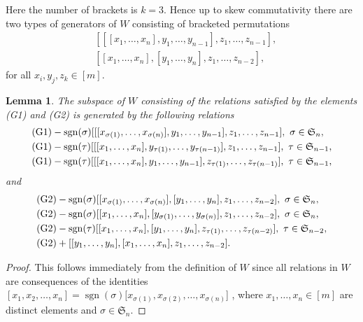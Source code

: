 \documentclass[11pt]{amsart}
\newtheorem{lem}[thm]{Lemma}
\theoremstyle{definition}
\numberwithin{equation}{section}
\DeclareMathOperator{\sign}{sgn}
\begin{document}
Here the number of brackets is $k=3$. Hence up to skew commutativity there are two types of generators of $W$ consisting of bracketed permutations
\begin{align}\tag{G1} &[[[{x_1},\dots ,{x_n} ],{y_{1}},\dots, y_{n-1}], z_{1},\dots ,z_{n-1}  ], \\&\tag{G2}[[{x_1},\dots ,{x_n} ],[{y_{1}},\dots, y_{n}], z_{1},\dots ,z_{n-2}  ],
\end{align}
for all $x_i, y_j, z_k \in [m]$.
\begin{lem}\label{Wgen} The subspace of $W$ consisting of the relations satisfied by the elements \textup{(G1)} and \textup{(G2)} is generated by the following relations
	\begin{align}
		\label{51}\textup{(G1)}&- \sign(\sigma)[[[{x_{\sigma(1)}},\dots ,{x_{\sigma(n)}} ],{y_{1}},\dots, y_{n-1}], z_{1},\dots ,z_{n-1}], \ \sigma \in \mathfrak{S}_n, \\\label{52}\textup{(G1)}&-\sign(\tau)[[[{x_{1}},\dots ,{x_{n}} ],{y_{\tau(1)}},\dots, y_{\tau(n-1)}], z_{1},\dots ,z_{n-1}], \ \tau \in \mathfrak{S}_{n-1},\\\label{53}\textup{(G1)}&-\sign(\tau)[[[{x_{1}},\dots ,{x_{n}} ],{y_{1}},\dots, y_{n-1}], z_{\tau(1)},\dots ,z_{\tau(n-1)}], \ \tau \in \mathfrak{S}_{n-1},
	\end{align}
	and
	\begin{align}
		\label{54}\textup{(G2)}&-\sign(\sigma)[[{x_{\sigma(1)}},\dots ,{x_{\sigma(n)}} ],[{y_{1}},\dots, y_{n}],  z_{1},\dots ,z_{n-2}  ],  \ \sigma \in \mathfrak{S}_n,
		\\\label{55}\textup{(G2)}&-\sign(\sigma)[[{x_1},\dots ,{x_n} ],[{y_{\sigma(1)}},\dots, y_{\sigma(n)}], z_{1},\dots ,z_{n-2}  ], \ \sigma \in \mathfrak{S}_n,\\
		\label{56}\textup{(G2)}&-\sign(\tau)[[{x_1},\dots ,{x_n} ],[{y_{1}},\dots, y_{n}], z_{\tau(1)},\dots ,z_{\tau(n-2)}  ], \ \tau \in \mathfrak{S}_{n-2},
		\\\label{57}\textup{(G2)}&+ [[{y_1},\dots ,{y_n} ],[{x_{1}},\dots, x_{n}], z_{1},\dots ,z_{n-2} ].
	\end{align}
	\end{lem}
\begin{proof}
	This follows immediately from the definition of $W$ since all relations in $W$ are consequences of the identities $[x_1, x_2, \dots, x_n]=\sign(\sigma)[x_{\sigma(1)}, x_{\sigma(2)}, \dots, x_{\sigma(n)}$] , where $x_1, \dots, x_n \in [m]$ are distinct elements and  $\sigma \in \mathfrak{S}_n$.
\end{proof}
\end{document}
